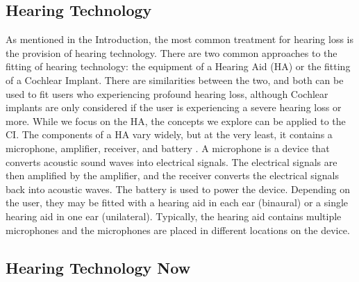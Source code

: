 \documentclass[logo,bsc,singlespacing,parskip,online]{infthesis}
\begin{document}
\subsection{Hearing Technology}
As mentioned in the Introduction, the most common treatment for hearing loss 
is the provision of hearing technology. There are two common approaches 
to the fitting of hearing technology: the equipment of a Hearing Aid (HA) 
or the fitting of a Cochlear Implant. There are similarities between the 
two, and both can be used to fit users who experiencing profound hearing loss, 
although Cochlear implants are only considered if the user is experiencing 
a severe hearing loss or more. While we 
focus on the HA, the concepts we explore can be applied to the CI.
The components of a HA vary widely, but at the very least, 
it contains a microphone, amplifier, receiver, and battery \citep{schuster-bruce_conventional_2025}.
A microphone is a device that converts acoustic sound waves into electrical signals. 
The electrical signals are then amplified by the amplifier, and the receiver converts the electrical 
signals back into acoustic waves. The battery is used to power the device. 
Depending on the user, they may be fitted with a hearing aid in each 
ear (binaural) or a single hearing aid in one ear (unilateral). 
Typically, the hearing aid contains multiple microphones and the microphones 
are placed in different locations on the device. 


\subsection{Hearing Technology Now}


\end{document}
